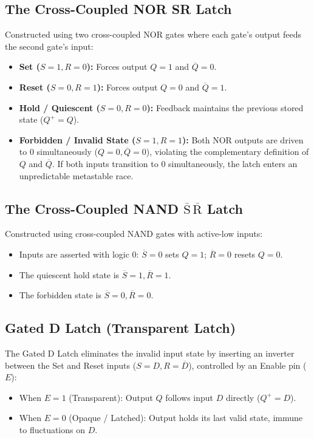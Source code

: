 \subsection{The Cross-Coupled NOR SR Latch}
Constructed using two cross-coupled NOR gates where each gate's output feeds the second gate's input:
\begin{itemize}
    \item \textbf{Set ($S = 1, R = 0$):} Forces output $Q = 1$ and $\overline{Q} = 0$.
    \item \textbf{Reset ($S = 0, R = 1$):} Forces output $Q = 0$ and $\overline{Q} = 1$.
    \item \textbf{Hold / Quiescent ($S = 0, R = 0$):} Feedback maintains the previous stored state ($Q^+ = Q$).
    \item \textbf{Forbidden / Invalid State ($S = 1, R = 1$):} Both NOR outputs are driven to $0$ simultaneously ($Q = 0, \overline{Q} = 0$), violating the complementary definition of $Q$ and $\overline{Q}$. If both inputs transition to $0$ simultaneously, the latch enters an unpredictable metastable race.
\end{itemize}

\subsection{The Cross-Coupled NAND $\overline{\text{S}}\,\overline{\text{R}}$ Latch}
Constructed using cross-coupled NAND gates with active-low inputs:
\begin{itemize}
    \item Inputs are asserted with logic $0$: $\overline{S}=0$ sets $Q=1$; $\overline{R}=0$ resets $Q=0$.
    \item The quiescent hold state is $\overline{S}=1, \overline{R}=1$.
    \item The forbidden state is $\overline{S}=0, \overline{R}=0$.
\end{itemize}

\subsection{Gated D Latch (Transparent Latch)}
The Gated D Latch eliminates the invalid input state by inserting an inverter between the Set and Reset inputs ($S = D, R = \overline{D}$), controlled by an Enable pin ($E$):
\begin{itemize}
    \item When $E = 1$ (Transparent): Output $Q$ follows input $D$ directly ($Q^+ = D$).
    \item When $E = 0$ (Opaque / Latched): Output holds its last valid state, immune to fluctuations on $D$.
\end{itemize}



